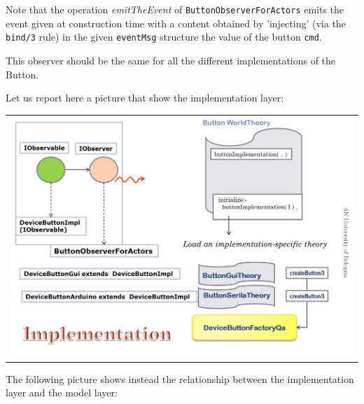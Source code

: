 Note that the operation \textit{emitTheEvent} of \texttt{ButtonObserverForActors} emits the event given at construction time with a content obtained by 'injecting' (via the \texttt{bind/3} rule) in the given \texttt{eventMsg} structure the value of the button \texttt{cmd}. 

This observer should be the same for all the different implementations of the Button.





Let us report here a picture that show the implementation layer:

\medskip 
\begin{center}
\begin{tabular}{ c }
     \includegraphics[scale = 0.45]{./img/buttonImplArch.jpg}\\
\end{tabular}{   }
\end{center}

The following picture shows instead the relationship between the implementation layer and the model layer:

